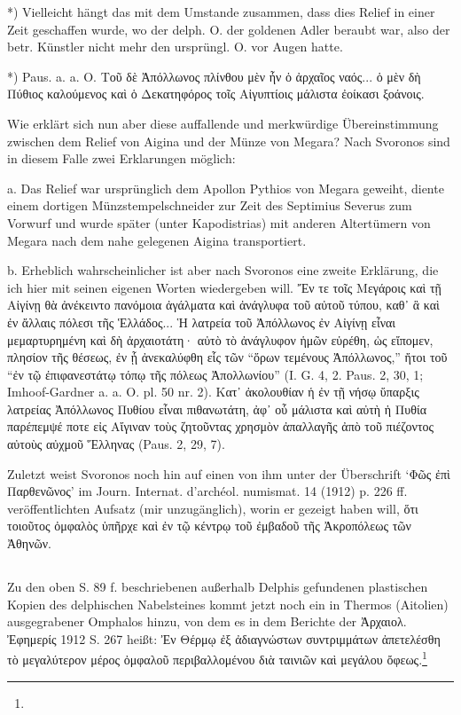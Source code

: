 \documentclass[a4paper, 11pt, oneside]{article}
\begin{document}
*) Vielleicht hängt das mit dem Umstande zusammen, dass dies Relief in einer Zeit geschaffen wurde, wo der delph. O. der goldenen Adler beraubt war, also der betr. Künstler nicht mehr den ursprüngl. O. vor Augen hatte.

*) Paus. a. a. O. Τοῦ δὲ Ἀπόλλωνος πλίνθου μὲν ἦν ὁ ἀρχαῖος ναός... ὁ μὲν δὴ Πύθιος καλούμενος καὶ ὁ Δεκατηφόρος τοῖς Αἰγυπτίοις μάλιστα ἐοίκασι ξοάνοις.

Wie erklärt sich nun aber diese auffallende und merkwürdige Übereinstimmung zwischen dem Relief von Aigina und der Münze von Megara? Nach Svoronos sind in diesem Falle zwei Erklarungen möglich:

a. Das Relief war ursprünglich dem Apollon Pythios von Megara geweiht, diente einem dortigen Münzstempelschneider zur Zeit des Septimius Severus zum Vorwurf und wurde später (unter Kapodistrias) mit anderen Altertümern von Megara nach dem nahe gelegenen Aigina transportiert.

b. Erheblich wahrscheinlicher ist aber nach Svoronos eine zweite Erklärung, die ich hier mit seinen eigenen Worten wiedergeben will. Ἔν τε τοῖς Μεγάροις καὶ τῇ Αἰγίνῃ θὰ ἀνέκειντο πανόμοια ἀγάλματα καὶ ἀνάγλυφα τοῦ αὐτοῦ τύπου, καθ᾽ ἃ καὶ ἐν ἄλλαις πόλεσι τῆς Ἑλλάδος... Ἡ λατρεία τοῦ Ἀπόλλωνος ἐν Αἰγίνῃ εἶναι μεμαρτυρημένη καὶ δὴ ἀρχαιοτάτη· αὐτὸ τὸ ἀνάγλυφον ἡμῶν εὑρέθη, ὡς εἴπομεν, πλησίον τῆς θέσεως, ἐν ᾗ ἀνεκαλύφθη εἷς τῶν "`ὅρων τεμένους Ἀπόλλωνος,"' ἤτοι τοῦ "`ἐν τῷ ἐπιφανεστάτῳ τόπῳ τῆς πόλεως Ἀπολλωνίου"' (I. G. 4, 2. Paus. 2, 30, 1; Imhoof-Gardner a. a. O. pl. 50 nr. 2). Κατ᾽ ἀκολουθίαν ἡ ἐν τῇ νήσῳ ὕπαρξις λατρείας Ἀπόλλωνος Πυθίου εἶναι πιθανωτάτη, ἀφ᾽ οὗ μάλιστα καὶ αὐτὴ ἡ Πυθία παρέπεμψέ ποτε εἰς Αἴγιναν τοὺς ζητοῦντας χρησμὸν ἀπαλλαγῆς ἀπὸ τοῦ πιέζοντος αὐτοὺς αὐχμοῦ Ἕλληνας (Paus. 2, 29, 7).

Zuletzt weist Svoronos noch hin auf einen von ihm unter der Überschrift `Φῶς ἐπὶ Παρθενῶνος' im Journ. Internat. d'archéol. numismat. 14 (1912) p. 226 ff. veröffentlichten Aufsatz (mir unzugänglich), worin er gezeigt haben will, ὅτι τοιοῦτος ὀμφαλὸς ὑπῆρχε καὶ ἐν τῷ κέντρῳ τοῦ ἐμβαδοῦ τῆς Ἀκροπόλεως τῶν Ἀθηνῶν.

\subsection{}
\paragraph{}
Zu den oben S. 89 f. beschriebenen außerhalb Delphis gefundenen plastischen Kopien des delphischen Nabelsteines kommt jetzt noch ein in Thermos (Aitolien) ausgegrabener Omphalos hinzu, von dem es in dem Berichte der Ἀρχαιολ. Ἐφημερίς 1912 S. 267 heißt: Ἐν Θέρμῳ ἐξ ἀδιαγνώστων συντριμμάτων ἀπετελέσθη τὸ μεγαλύτερον μέρος ὀμφαλοῦ περιβαλλομένου διὰ ταινιῶν καὶ μεγάλου ὄφεως.\footnote{}
\end{document}
